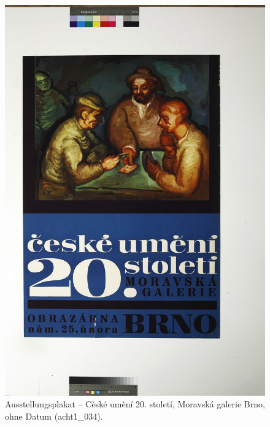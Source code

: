 \documentclass[a4paper,12pt,ngerman]{article}
\begin{document}
\newpage
\begin{figure}[ht]
\includegraphics[width=\linewidth]{Abbildung_39_(acht1_034)}
\centering
\caption{Ausstellungsplakat -- Cèské umèní 20. století, Moravská galerie Brno, ohne Datum (acht1\_034).}
\end{figure}
\end{document}
